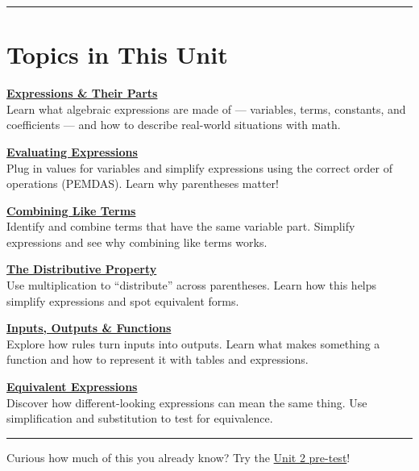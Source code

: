 \documentclass[
  letterpaper,
  DIV=11,
  numbers=noendperiod]{scrreprt}
\begin{document}
\begin{center}\rule{0.5\linewidth}{0.5pt}\end{center}

\section*{Topics in This Unit}\label{topics-in-this-unit-1}


\href{2.1_Expressions_and_their_parts.html}{\textbf{Expressions \& Their
Parts}}\\
Learn what algebraic expressions are made of --- variables, terms,
constants, and coefficients --- and how to describe real-world
situations with math.

\href{2.2_Evaluating_expressions.html}{\textbf{Evaluating
Expressions}}\\
Plug in values for variables and simplify expressions using the correct
order of operations (PEMDAS). Learn why parentheses matter!

\href{2.3_Combining_like_terms.html}{\textbf{Combining Like Terms}}\\
Identify and combine terms that have the same variable part. Simplify
expressions and see why combining like terms works.

\href{2.4_The_distributive_property.html}{\textbf{The Distributive
Property}}\\
Use multiplication to ``distribute'' across parentheses. Learn how this
helps simplify expressions and spot equivalent forms.

\href{2.5_Inputs_outputs_and_functions.html}{\textbf{Inputs, Outputs \&
Functions}}\\
Explore how rules turn inputs into outputs. Learn what makes something a
function and how to represent it with tables and expressions.

\href{2.6_Equivalent_expressions.html}{\textbf{Equivalent
Expressions}}\\
Discover how different-looking expressions can mean the same thing. Use
simplification and substitution to test for equivalence.

\begin{center}\rule{0.5\linewidth}{0.5pt}\end{center}

Curious how much of this you already know? Try the
\href{./chapters/Supplemental/worksheets/Unit_2/pretest.pdf}{Unit 2
pre-test}!
\end{document}
